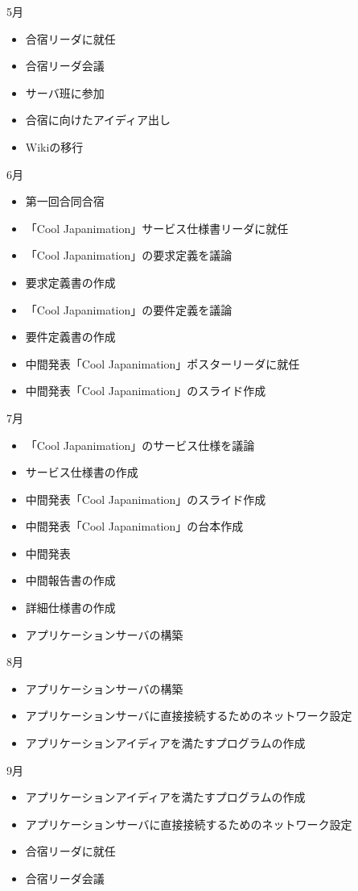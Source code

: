 5月
\begin{itemize}
\item 合宿リーダに就任
\item 合宿リーダ会議
\item サーバ班に参加
\item 合宿に向けたアイディア出し
\item Wikiの移行
\end{itemize}
6月
\begin{itemize}
\item 第一回合同合宿
\item 「Cool Japanimation」サービス仕様書リーダに就任
\item 「Cool Japanimation」の要求定義を議論
\item 要求定義書の作成
\item 「Cool Japanimation」の要件定義を議論
\item 要件定義書の作成
\item 中間発表「Cool Japanimation」ポスターリーダに就任
\item 中間発表「Cool Japanimation」のスライド作成
\end{itemize}
7月
\begin{itemize}
\item 「Cool Japanimation」のサービス仕様を議論
\item サービス仕様書の作成
\item 中間発表「Cool Japanimation」のスライド作成
\item 中間発表「Cool Japanimation」の台本作成
\item 中間発表
\item 中間報告書の作成
\item 詳細仕様書の作成
\item アプリケーションサーバの構築
\end{itemize}
8月
\begin{itemize}
\item アプリケーションサーバの構築 
\item アプリケーションサーバに直接接続するためのネットワーク設定
\item アプリケーションアイディアを満たすプログラムの作成
\end{itemize}
9月
\begin{itemize}
\item アプリケーションアイディアを満たすプログラムの作成
\item アプリケーションサーバに直接接続するためのネットワーク設定
\item 合宿リーダに就任
\item 合宿リーダ会議
\end{itemize}
